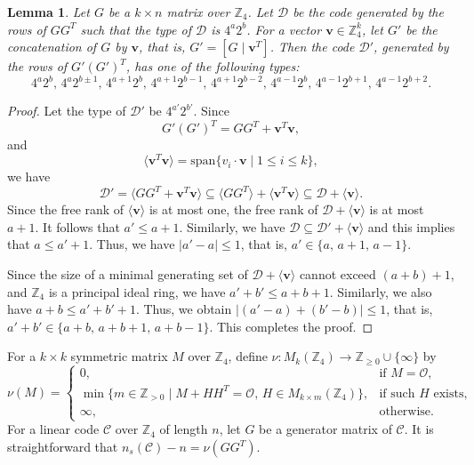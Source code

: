 \documentclass{article}
\newtheorem{lemma}[theorem]{Lemma}
\theoremstyle{definition}
\theoremstyle{remark}
\begin{document}
\begin{lemma}\label{add-column-type}
    Let $G$ be a $k\times n$ matrix over $\mathbb{Z}_4$. Let $\mathcal{D}$ be the code generated by the rows of $GG^T$ such that the type of $\mathcal{D}$ is $4^a2^b$. For a vector $\mathbf{v}\in\mathbb{Z}_4^k$, let $G'$ be the concatenation of $G$ by $\mathbf{v}$, that is, $G'=[G\mid\mathbf{v}^T]$. Then the code $\mathcal{D}'$, generated by the rows of $G'(G')^T$, has one of the following types:
    \[
    4^{a}2^b,\,4^a2^{b\pm 1},\,4^{a+1}2^b,\,4^{a+1}2^{b-1},\,4^{a+1}2^{b-2},\,4^{a-1}2^b,\,4^{a-1}2^{b+1},\,4^{a-1}2^{b+2}.
    \]
\end{lemma}
\begin{proof}
Let the type of $\mathcal{D}'$ be $4^{a'}2^{b'}$. Since
\[
G'(G')^T=GG^T+\mathbf{v}^T\mathbf{v},
\]
and
\[
\langle \mathbf{v}^T\mathbf{v}\rangle=\mathrm{span}\{v_i\cdot\mathbf{v}\mid 1\le i\le k\},
\]
we have 
\[
\mathcal{D}'=\langle GG^T+\mathbf{v}^T\mathbf{v}\rangle\subseteq \langle GG^T\rangle+\langle\mathbf{v}^T\mathbf{v}\rangle\subseteq \mathcal{D}+\langle \mathbf{v}\rangle.
\]
Since the free rank of $\langle \mathbf{v}\rangle$ is at most one, the free rank of $\mathcal{D}+\langle\mathbf{v}\rangle$ is at most $a+1$. It follows that $a'\le a+1$. Similarly, we have $\mathcal{D}\subseteq \mathcal{D}'+\langle\mathbf{v}\rangle$ and this implies that $a\le a'+1$. Thus, we have $|a'-a|\le 1$, that is, $a'\in\{a,\, a+1,\, a-1\}$.

Since the size of a minimal generating set of $\mathcal{D}+\langle \mathbf{v}\rangle$ cannot exceed $(a+b)+1$, and $\mathbb{Z}_4$ is a principal ideal ring, we have $a'+b'\le a+b+1$. Similarly, we also have $a+b\le a'+b'+1$. Thus, we obtain $|(a'-a)+(b'-b)|\le 1$, that is, $a'+b'\in\{a+b,\,a+b+1,\,a+b-1\}$. This completes the proof.
\end{proof}

For a $k\times k$ symmetric matrix $M$ over $\mathbb{Z}_4$, define $\nu:M_{k}(\mathbb{Z}_4)\to \mathbb{Z}_{\ge 0}\cup \{\infty\}$ by
\[
\nu(M) = \begin{cases} 
0, & \text{if }M=\mathcal{O},\\
\min \{ m\in\mathbb{Z}_{> 0} \mid M + HH^T = \mathcal{O}, \, H \in M_{k \times m}(\mathbb{Z}_4) \}, & \text{if such } H \text{ exists,} \\ 
\infty, & \text{otherwise.} 
\end{cases}
\]
For a linear code $\mathcal{C}$ over $\mathbb{Z}_4$ of length $n$, let $G$ be a generator matrix of $\mathcal{C}$. It is straightforward that $n_s(\mathcal{C})-n=\nu(GG^T)$.
\end{document}
